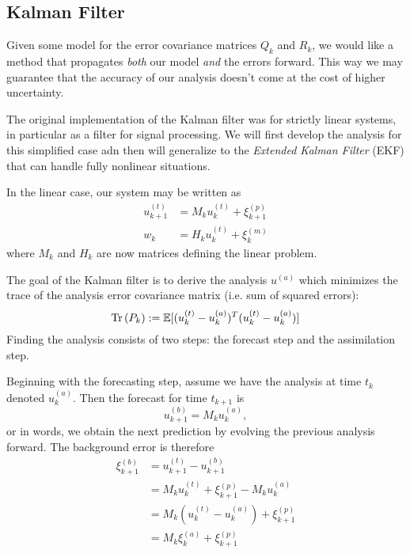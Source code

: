 \subsection{Kalman Filter}
Given some model for the error covariance matrices $Q_k$ and $R_k$, we would like a method that propagates \textit{both} our model \emph{and} the errors forward. This way we may guarantee that the accuracy of our analysis doesn't come at the cost of higher uncertainty.

The original implementation of the Kalman filter was for strictly linear systems, in particular as a filter for signal processing. We will first develop the analysis for this simplified case adn then will generalize to the \textit{Extended Kalman Filter} (EKF) that can handle fully nonlinear situations.

In the linear case, our system may be written as
\begin{align}
    u_{k+1}^{(t)} &= M_ku_k^{(t)} + \xi_{k+1}^{(p)} \\
    w_k &= H_ku_k^{(t)} + \xi_k^{(m)}
\end{align}
where $M_k$ and $H_k$ are now matrices defining the linear problem.

The goal of the Kalman filter is to derive the analysis $u^{(a)}$ which minimizes the trace of the analysis error covariance matrix (i.e. sum of squared errors): \begin{equation}
    \mathrm{Tr}\left( P_k\right) := \mathbb{E}[(u_k^{(t)}-u_k^{(a)})^T(u_k^{(t)}-u_k^{(a)})]
\end{equation}
Finding the analysis consists of two steps: the forecast step and the assimilation step.

Beginning with the forecasting step, assume we have the analysis at time $t_k$ denoted $u_k^{(a)}$. Then the forecast for time $t_{k+1}$ is
\begin{equation}
    u_{k+1}^{(b)} = M_ku_k^{(a)},
\end{equation}
or in words, we obtain the next prediction by evolving the previous analysis forward. The background error is therefore
\begin{align}
    \xi_{k+1}^{(b)} &= u_{k+1}^{(t)} - u_{k+1}^{(b)} \\
    &= M_ku_k^{(t)}+\xi_{k+1}^{(p)} - M_{k}u_k^{(a)} \\
    &= M_k\left(u_k^{(t)}-u_k^{(a)} \right) + \xi_{k+1}^{(p)} \\
    &= M_k\xi_k^{(a)} + \xi_{k+1}^{(p)}
\end{align}

